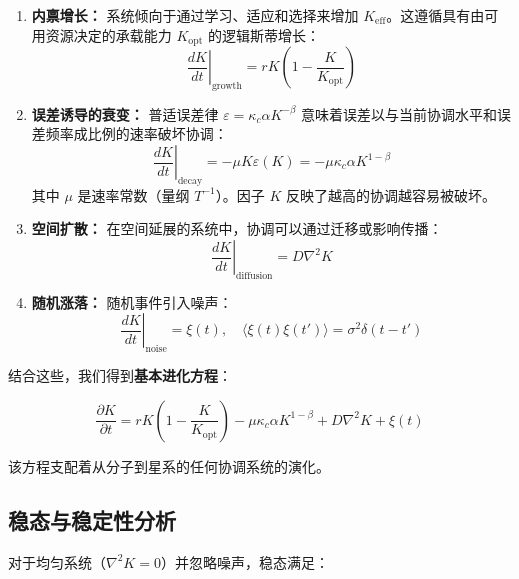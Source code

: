\documentclass[12pt,a4paper]{article}
\theoremstyle{remark}
\newcommand{\Keff}{K_{\mathrm{eff}}}
\newcommand{\Keffopt}{K_{\mathrm{opt}}}
\newcommand{\kappac}{\kappa_c}
\newcommand{\eps}{\varepsilon}
\begin{document}
	\begin{enumerate}
		\item \textbf{内禀增长：} 系统倾向于通过学习、适应和选择来增加 $\Keff$。这遵循具有由可用资源决定的承载能力 $\Keffopt$ 的逻辑斯蒂增长：
		\begin{equation}
			\left.\frac{dK}{dt}\right|_{\text{growth}} = r K \left(1 - \frac{K}{\Keffopt}\right)
			\label{eq:growth}
		\end{equation}
		
		\item \textbf{误差诱导的衰变：} 普适误差律 $\eps = \kappac \alpha K^{-\beta}$ 意味着误差以与当前协调水平和误差频率成比例的速率破坏协调：
		\begin{equation}
			\left.\frac{dK}{dt}\right|_{\text{decay}} = -\mu K \eps(K) = -\mu \kappac \alpha K^{1-\beta}
			\label{eq:decay}
		\end{equation}
		其中 $\mu$ 是速率常数（量纲 $T^{-1}$）。因子 $K$ 反映了越高的协调越容易被破坏。
		
		\item \textbf{空间扩散：} 在空间延展的系统中，协调可以通过迁移或影响传播：
		\begin{equation}
			\left.\frac{dK}{dt}\right|_{\text{diffusion}} = D \nabla^2 K
			\label{eq:diffusion}
		\end{equation}
		
		\item \textbf{随机涨落：} 随机事件引入噪声：
		\begin{equation}
			\left.\frac{dK}{dt}\right|_{\text{noise}} = \xi(t), \quad \langle \xi(t)\xi(t')\rangle = \sigma^2 \delta(t-t')
			\label{eq:noise}
		\end{equation}
	\end{enumerate}
	
	结合这些，我们得到\textbf{基本进化方程}：
	
	\begin{equation}
		\boxed{\frac{\partial K}{\partial t} = r K \left(1 - \frac{K}{\Keffopt}\right) - \mu \kappac \alpha K^{1-\beta} + D \nabla^2 K + \xi(t)}
		\label{eq:evolution}
	\end{equation}
	
	该方程支配着从分子到星系的任何协调系统的演化。
	
	\subsection{稳态与稳定性分析}
	
	对于均匀系统（$\nabla^2 K = 0$）并忽略噪声，稳态满足：
	
\end{document}
